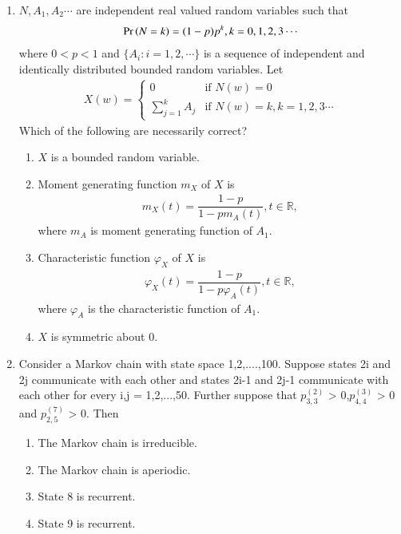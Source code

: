 \renewcommand{\theequation}{\theenumi}
\renewcommand{\thefigure}{\theenumi}
\begin{enumerate}[label=\thesection.\arabic*.,ref=\thesection.\theenumi]

\item  $N,A_1,A_2\cdots$ are independent real valued random variables such that 
    \begin{align}
        \Pr\left(N=k\right)=(1-p)p^k,k=0,1,2,3\cdots
    \end{align}
    where $0<p<1$ and $\{A_i:i=1,2,\cdots\}$ is a sequence of independent and identically distributed bounded random variables. Let 
    \begin{align}
        X(w) = 
        \begin{cases}
        0  & \text{if } N(w)=0\\
        \sum_{j=1}^{k} A_j & \text{if } N(w)=k,k=1,2,3\cdots 
        \end{cases}
    \end{align}
    Which of the following are necessarily correct?\\
    \begin{enumerate}
        \item $X$ is a bounded random variable. 
        \item Moment generating function $m_X$ of $X$ is
        \begin{align}
            m_X(t)=\dfrac{1-p}{1-pm_A(t)}, t\in \mathbb{R},
        \end{align}
        where $m_A$ is moment generating function of $A_1$.
        \item Characteristic function $\varphi_X$ of $X$ is
        \begin{align}
            \varphi_X(t)=\dfrac{1-p}{1-p\varphi_A(t)},t\in \mathbb{R},
        \end{align}
        where $\varphi_A$ is the characteristic function of $A_1$.
        \item $X$ is symmetric about 0.
    \end{enumerate}


\item Consider a Markov chain with state space {1,2,....,100}. Suppose states 2i and 2j communicate with each other and states 2i-1 and 2j-1 communicate with each other for every i,j = 1,2,...,50. Further suppose that $p^{(2)}_{3,3}$ > 0,$p^{(3)}_{4,4}$ > 0 and $p^{(7)}_{2,5}$ > 0. Then 
\begin{enumerate}
\item The Markov chain is irreducible.
\item The Markov chain is aperiodic.
\item State 8 is recurrent.
\item State 9 is recurrent.
\end{enumerate}
\solution

\end{enumerate}
